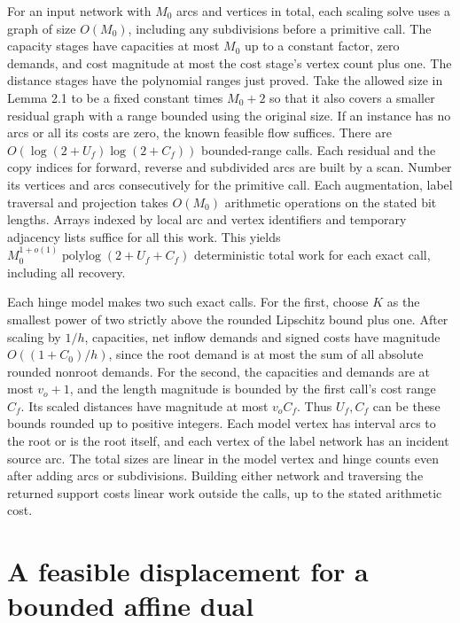\documentclass[11pt]{article}
\begin{document}
For an input network with \(M_0\) arcs and vertices in total, each scaling solve uses a graph of size \(O(M_0)\), including any subdivisions before a primitive call. The capacity stages have capacities at most \(M_0\) up to a constant factor, zero demands, and cost magnitude at most the cost stage's vertex count plus one. The distance stages have the polynomial ranges just proved. Take the allowed size in Lemma 2.1 to be a fixed constant times \(M_0+2\) so that it also covers a smaller residual graph with a range bounded using the original size. If an instance has no arcs or all its costs are zero, the known feasible flow suffices. There are \(O(\log(2+U_f)\log(2+C_f))\) bounded-range calls. Each residual and the copy indices for forward, reverse and subdivided arcs are built by a scan. Number its vertices and arcs consecutively for the primitive call. Each augmentation, label traversal and projection takes \(O(M_0)\) arithmetic operations on the stated bit lengths. Arrays indexed by local arc and vertex identifiers and temporary adjacency lists suffice for all this work. This yields \(M_0^{1+o(1)}\operatorname{polylog}(2+U_f+C_f)\) deterministic total work for each exact call, including all recovery.

Each hinge model makes two such exact calls. For the first, choose \(K\) as the smallest power of two strictly above the rounded Lipschitz bound plus one. After scaling by \(1/h\), capacities, net inflow demands and signed costs have magnitude \(O((1+C_0)/h)\), since the root demand is at most the sum of all absolute rounded nonroot demands. For the second, the capacities and demands are at most \(v_o+1\), and the length magnitude is bounded by the first call's cost range \(C_f\). Its scaled distances have magnitude at most \(v_o C_f\). Thus \(U_f,C_f\) can be these bounds rounded up to positive integers. Each model vertex has interval arcs to the root or is the root itself, and each vertex of the label network has an incident source arc. The total sizes are linear in the model vertex and hinge counts even after adding arcs or subdivisions. Building either network and traversing the returned support costs linear work outside the calls, up to the stated arithmetic cost.

\hypertarget{a-feasible-displacement-for-a-bounded-affine-dual}{%
\section*{A feasible displacement for a bounded affine dual}\label{a-feasible-displacement-for-a-bounded-affine-dual}}
\end{document}
